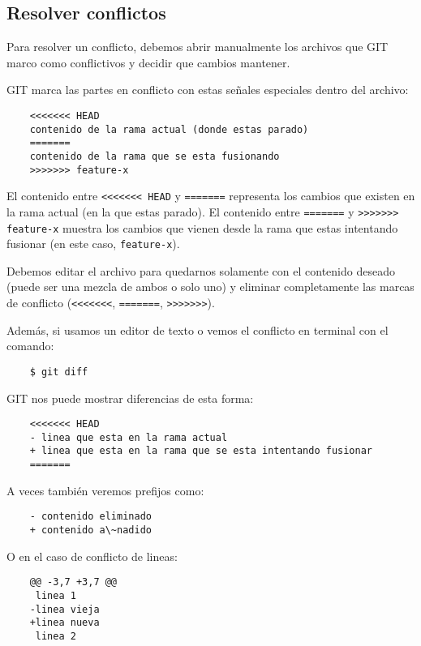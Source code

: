 \subsection{Resolver conflictos}
    Para resolver un conflicto, debemos abrir manualmente los archivos que GIT marco como conflictivos y decidir que cambios mantener.

    GIT marca las partes en conflicto con estas se\~nales especiales dentro del archivo:

    \begin{lstlisting}
    <<<<<<< HEAD
    contenido de la rama actual (donde estas parado)
    =======
    contenido de la rama que se esta fusionando
    >>>>>>> feature-x
    \end{lstlisting}

    El contenido entre \texttt{<<<<<<< HEAD} y \texttt{=======} representa los cambios que existen en la rama actual (en la que estas parado). El contenido entre \texttt{=======} y \texttt{>>>>>>> feature-x} muestra los cambios que vienen desde la rama que estas intentando fusionar (en este caso, \texttt{feature-x}).

    Debemos editar el archivo para quedarnos solamente con el contenido deseado (puede ser una mezcla de ambos o solo uno) y eliminar completamente las marcas de conflicto (\texttt{<<<<<<<}, \texttt{=======}, \texttt{>>>>>>>}).

    Adem\'as, si usamos un editor de texto o vemos el conflicto en terminal con el comando:

    \begin{lstlisting}
    $ git diff
    \end{lstlisting}

    GIT nos puede mostrar diferencias de esta forma:

    \begin{lstlisting}
    <<<<<<< HEAD
    - linea que esta en la rama actual
    + linea que esta en la rama que se esta intentando fusionar
    =======
    \end{lstlisting}

    A veces tambi\'en veremos prefijos como:

    \begin{lstlisting}
    - contenido eliminado
    + contenido a\~nadido
    \end{lstlisting}

    O en el caso de conflicto de lineas:

    \begin{lstlisting}
    @@ -3,7 +3,7 @@
     linea 1
    -linea vieja
    +linea nueva
     linea 2
    \end{lstlisting}

